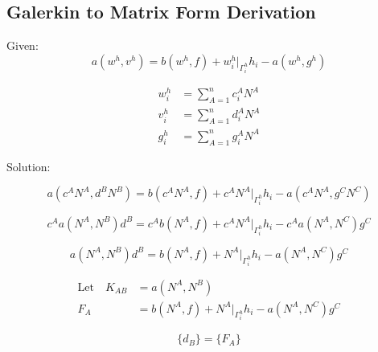 \documentclass[a4paper, 12pt]{article}
\begin{document}
\newpage
\subsection{Galerkin to Matrix Form Derivation} \label{sec:MatrixDer}

Given:
\begin{equation*}
a(w^{h} , v^{h})
 = b(w^{h} , f)
  + w^{h}_{i}\Big|_{\Gamma^{h}_{i}} h_{i}
  - a(w^{h} , g^{h})
\end{equation*}

\begin{align*}
w^{h}_i &= \sum_{A=1}^{n} c^{A}_i N^{A}  \\
v^{h}_i &= \sum_{A=1}^{n} d^{A}_i N^{A}  \\
g^{h}_i &=  \sum_{A=1}^{n} g^{A}_i N^{A}
\end{align*}

\noindent
Solution:

\begin{equation*}
a(c^{A} N^{A}, d^{B} N^{B})
 = b( c^{A} N^{A} , f)
  + c^{A} N^{A}\Big|_{\Gamma^{h}_{i}} h_{i}
  - a( c^{A} N^{A}, g^{C} N^{C})
\end{equation*}

\begin{equation*}
c^{A} a(N^{A}, N^{B})d^{B}
 = c^{A} b( N^{A} , f)
  + c^{A} N^{A}\Big|_{\Gamma^{h}_{i}} h_{i}
  - c^{A}a( N^{A}, N^{C})g^{C}
\end{equation*}

\begin{equation*}
a(N^{A}, N^{B})d^{B}
 = b( N^{A} , f)
  + N^{A}\Big|_{\Gamma^{h}_{i}} h_{i}
  - a( N^{A}, N^{C})g^{C}
\end{equation*}

\begin{align*}
\text{Let}\quad K_{AB} &= a(N^{A}, N^{B}) \\
F_A &= b( N^{A} , f)
  + N^{A}\Big|_{\Gamma^{h}_{i}} h_{i}
  - a( N^{A}, N^{C})g^{C}
\end{align*}

\begin{equation*}
[ K_{AB} ] \{ d_B \} = \{ F_A \}
\end{equation*}
\end{document}

